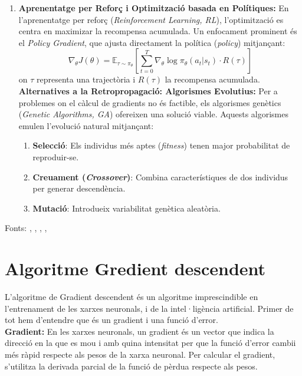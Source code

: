 \begin{enumerate}
\begin{enumerate}
\begin{enumerate}
               \end{enumerate}
           \item \textbf{Aprenentatge per Reforç i Optimització basada en Polítiques:} En l'aprenentatge per reforç (\textit{Reinforcement Learning, RL}), l'optimització es centra en maximizar la recompensa acumulada. Un enfocament prominent és el \textit{Policy Gradient}, que ajusta directament la política (\textit{policy}) mitjançant:
           \[ \nabla_\theta J(\theta) = \mathbb{E}_{\tau \sim \pi_\theta} \left[ \sum_{t=0}^T \nabla_\theta \log \pi_\theta(a_t|s_t) \cdot R(\tau) \right] \]
           on $\tau$ representa una trajectòria i $R(\tau)$ la recompensa acumulada.
           \textbf{Alternatives a la Retropropagació: Algorismes Evolutius:} Per a problemes on el càlcul de gradients no és factible, els algorismes genètics (\textit{Genetic Algorithms, GA}) ofereixen una solució viable. Aquests algorismes emulen l'evolució natural mitjançant:
               \begin{enumerate}
                \item \textbf{Selecció}: Els individus més aptes (\textit{fitness}) tenen major probabilitat de reproduir-se.

                \item \textbf{Creuament (\textit{Crossover})}: Combina característiques de dos individus per generar descendència.

                \item \textbf{Mutació}: Introdueix variabilitat genètica aleatòria.
               \end{enumerate}
    \end{enumerate}


\end{enumerate}

Fonts: \cite{Rumelhart1986}, \cite{NIPS2014_f033ed80}, \cite{kingma2022autoencodingvariationalbayes}, \cite{NIPS1999_464d828b}, \cite{Holland:1975}\\
 \section{Algoritme Gredient descendent}\label{Algoritme_gradient}
   L'algoritme de Gradient descendent és un algoritme imprescindible en l'entrenament de les xarxes neuronals, i de la intel·ligència artificial. Primer de tot hem d'entendre que és un gradient i una funció d'error.\\

         \textbf{Gradient: } En les xarxes neuronals, un gradient és un vector que indica la direcció en la que es mou i amb quina intensitat per que la funció d'error cambii més ràpid respecte als pesos de la xarxa neuronal. Per calcular el gradient, s'utilitza la derivada parcial de la funció de pèrdua respecte als pesos.\\

